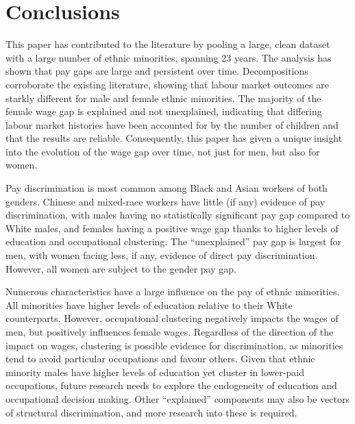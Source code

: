 \documentclass[class=article, crop=false]{standalone}
\begin{document}
\section{Conclusions}
\label{sec:Conclusions}
This paper has contributed to the literature by pooling a large, clean dataset with a large number of ethnic minorities, spanning 23 years. The analysis has shown that pay gaps are large and persistent over time. Decompositions corroborate the existing literature, showing that labour market outcomes are starkly different for male and female ethnic minorities. The majority of the female wage gap is explained and not unexplained, indicating that differing labour market histories have been accounted for by the number of children and that the results are reliable. Consequently, this paper has given a unique insight into the evolution of the wage gap over time, not just for men, but also for women. %

Pay discrimination is most common among Black and Asian workers of both genders. Chinese and mixed-race workers have little (if any) evidence of pay discrimination, with males having no statistically significant pay gap compared to White males, and females having a positive wage gap thanks to higher levels of education and occupational clustering. The \enquote{unexplained} pay gap is largest for men, with women facing less, if any, evidence of direct pay discrimination. However, all women are subject to the gender pay gap.

Numerous characteristics have a large influence on the pay of ethnic minorities. All minorities have higher levels of education relative to their White counterparts. However, occupational clustering negatively impacts the wages of men, but positively influences female wages. Regardless of the direction of the impact on wages, clustering is possible evidence for discrimination, as minorities tend to avoid particular occupations and favour others. Given that ethnic minority males have higher levels of education yet cluster in lower-paid occupations, future research needs to explore the endogeneity of education and occupational decision making. Other \enquote{explained} components may also be vectors of structural discrimination, and more research into these is required.
\end{document}

